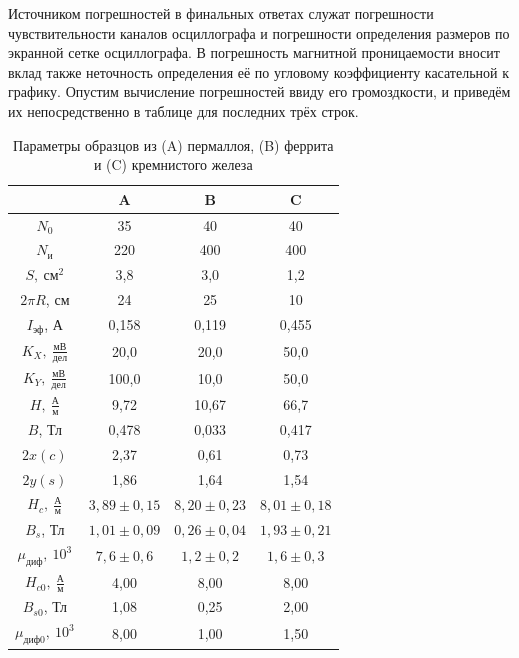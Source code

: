 \documentclass[a4paper, 12pt]{article}
\begin{document}
Источником погрешностей в финальных ответах служат погрешности чувствительности каналов осциллографа и погрешности определения размеров по экранной сетке осциллографа. В погрешность магнитной проницаемости вносит вклад также неточность определения её по угловому коэффициенту касательной к графику. Опустим вычисление погрешностей ввиду его громоздкости, и приведём их непосредственно в таблице для последних трёх строк.

\begin{table}[h]
	\centering
	\caption{Параметры образцов из (A) пермаллоя, (B) феррита и (C) кремнистого железа} \label{Table_1}
	\begin{tabular}{|c|c|c|c|}
		\hline
		 & A & B & C \\ \hline
		$N_0$ & 35 & 40 & 40  \\ \hline
		$N_{\text{и}}$ & 220 & 400 & 400 \\ \hline
		$S,\ \text{см}^2$ & 3,8 & 3,0 & 1,2 \\ \hline
		$2\pi R$, см & 24 & 25 & 10 \\ \hline
		$I_{\text{эф}}$, А & 0,158 & 0,119 & 0,455 \\ \hline
		$K_X,\ \frac{\text{мВ}}{\text{дел}}$ & 20,0 & 20,0 & 50,0 \\ \hline
		$K_Y,\ \frac{\text{мВ}}{\text{дел}}$ & 100,0 & 10,0 & 50,0 \\ \hline
		$H,\ \frac{\text{А}}{\text{м}}$ & 9,72 & 10,67 & 66,7 \\ \hline
		$B$, Тл & 0,478 & 0,033 & 0,417 \\ \hline
		$2x\left(c\right)$ & 2,37 & 0,61 & 0,73 \\ \hline
		$2y\left(s\right)$ & 1,86 & 1,64 & 1,54 \\ \hline
		$H_c,\ \frac{\text{А}}{\text{м}}$ & $3,89\pm0,15$ & $8,20\pm0,23$ & $8,01\pm0,18$ \\ \hline
		$B_s$, Тл & $1,01\pm0,09$ & $0,26\pm0,04$ & $1,93\pm0,21$ \\ \hline
		$\mu_{\text{диф}},\ 10^3$ & $7,6\pm0,6$ & $1,2\pm0,2$ & $1,6\pm0,3$ \\ \hline
		$H_{c0},\ \frac{\text{А}}{\text{м}}$ & 4,00 & 8,00 & 8,00 \\ \hline
		$B_{s0}$, Тл & 1,08 & 0,25 & 2,00 \\ \hline
		$\mu_{\text{диф}0},\ 10^3$ & 8,00 & 1,00 & 1,50 \\ \hline
	\end{tabular}
\end{table}
\end{document}
